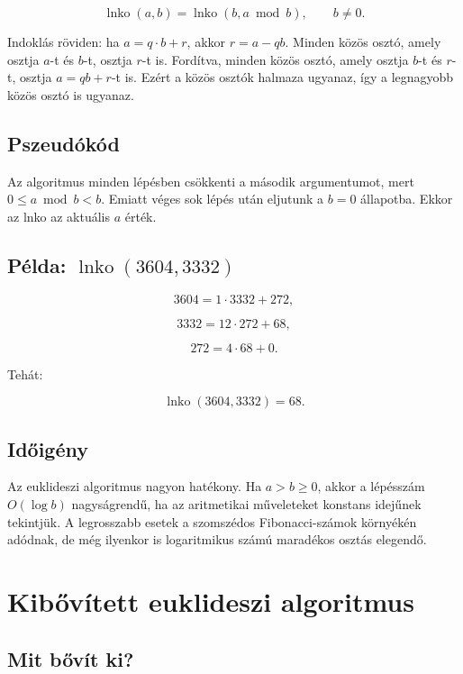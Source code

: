 \[
\operatorname{lnko}(a,b)=\operatorname{lnko}(b,a\bmod b),\qquad b\neq0.
\]

Indoklás röviden: ha $a=q\cdot b+r$, akkor $r=a-qb$. Minden közös osztó, amely osztja $a$-t és $b$-t, osztja $r$-t is. Fordítva, minden közös osztó, amely osztja $b$-t és $r$-t, osztja $a=qb+r$-t is. Ezért a közös osztók halmaza ugyanaz, így a legnagyobb közös osztó is ugyanaz.

\subsection{Pszeudókód}


Az algoritmus minden lépésben csökkenti a második argumentumot, mert $0\leq a\bmod b<b$. Emiatt véges sok lépés után eljutunk a $b=0$ állapotba. Ekkor az lnko az aktuális $a$ érték.



\subsection{Példa: $\operatorname{lnko}(3604,3332)$}

\[
3604=1\cdot3332+272,
\]

\[
3332=12\cdot272+68,
\]

\[
272=4\cdot68+0.
\]

Tehát:

\[
\operatorname{lnko}(3604,3332)=68.
\]

\subsection{Időigény}

Az euklideszi algoritmus nagyon hatékony. Ha $a>b\geq0$, akkor a lépésszám $O(\log b)$ nagyságrendű, ha az aritmetikai műveleteket konstans idejűnek tekintjük. A legrosszabb esetek a szomszédos Fibonacci-számok környékén adódnak, de még ilyenkor is logaritmikus számú maradékos osztás elegendő.

\section{Kibővített euklideszi algoritmus}

\subsection{Mit bővít ki?}

